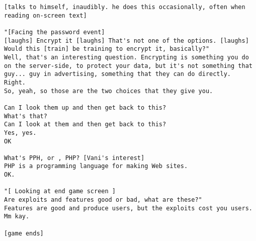 \begin{lstlisting}
[talks to himself, inaudibly. he does this occasionally, often when reading on-screen text]

"[Facing the password event]
[laughs] Encrypt it [laughs] That's not one of the options. [laughs] Would this [train] be training to encrypt it, basically?"
Well, that's an interesting question. Encrypting is something you do on the server-side, to protect your data, but it's not something that guy... guy in advertising, something that they can do directly.
Right.
So, yeah, so those are the two choices that they give you.

Can I look them up and then get back to this?
What's that?
Can I look at them and then get back to this?
Yes, yes.
OK

What's PPH, or , PHP? [Vani's interest]
PHP is a programming language for making Web sites.
OK.

"[ Looking at end game screen ]
Are exploits and features good or bad, what are these?"
Features are good and produce users, but the exploits cost you users.
Mm kay.

[game ends]


\end{lstlisting}
